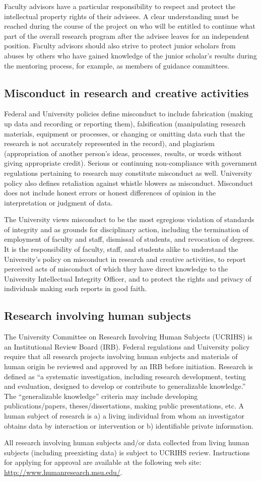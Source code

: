 Faculty advisors have a particular responsibility to respect and
protect the intellectual property rights of their advisees. A clear
understanding must be reached during the course of the project on who
will be entitled to continue what part of the overall research program
after the advisee leaves for an independent position. Faculty advisors
should also strive to protect junior scholars from abuses by others
who have gained knowledge of the junior scholar’s results during the
mentoring process, for example, as members of guidance committees. 

\subsection{Misconduct in research and creative activities}

Federal and University policies define misconduct to include
fabrication (making up data and recording or reporting them),
falsification (manipulating research materials, equipment or
processes, or changing or omitting data such that the research is not
accurately represented in the record), and plagiarism (appropriation
of another person’s ideas, processes, results, or words without giving
appropriate credit). Serious or continuing non-compliance with
government regulations pertaining to research may constitute
misconduct as well. University policy also defines retaliation against
whistle blowers as misconduct. Misconduct does not include honest
errors or honest differences of opinion in the interpretation or
judgment of data. 

The University views misconduct to be the most egregious violation of
standards of integrity and as grounds for disciplinary action,
including the termination of employment of faculty and staff,
dismissal of students, and revocation of degrees. It is the
responsibility of faculty, staff, and students alike to understand the
University’s policy on misconduct in research and creative activities,
to report perceived acts of misconduct of which they have direct
knowledge to the University Intellectual Integrity Officer, and to
protect the rights and privacy of individuals making such reports in
good faith. 

\subsection{Research involving human subjects}

The University Committee on Research Involving Human Subjects (UCRIHS)
is an Institutional Review Board (IRB). Federal regulations and
University policy require that all research projects involving human
subjects and materials of human origin be reviewed and approved by an
IRB before initiation. Research is defined as ``a systematic
investigation, including research development, testing and evaluation,
designed to develop or contribute to generalizable knowledge.'' The
``generalizable knowledge'' criteria may include developing
publications/papers, theses/dissertations, making public
presentations, etc. A human subject of research is a) a living
individual from whom an investigator obtains data by interaction or
intervention or b) identifiable private information.  

All research involving human subjects and/or data collected from
living human subjects (including preexisting data) is subject to
UCRIHS review. Instructions for applying for approval are available at
the following web site:  \url{http://www.humanresearch.msu.edu/}.

